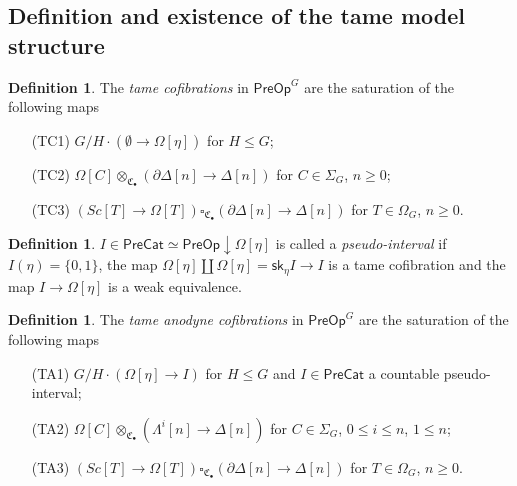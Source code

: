 \documentclass[a4paper,10pt
,draft
]{article}%
\numberwithin{equation}{section}
\numberwithin{figure}{section}
\theoremstyle{definition} %
\newtheorem{definition}[equation]{Definition}%
\newcommand{\1}{\ensuremath{\mathbbm 1}}%
\begin{document}
\subsection{Definition and existence of the tame model structure}
\label{TAMEDEFEX SEC}

\begin{definition}\label{TAMEGENCOF DEF}
	The \emph{tame cofibrations} in $\mathsf{PreOp}^G$
	are the saturation of the following maps
	\begin{itemize}
		\item[(TC1)] $G/H \cdot \left(\emptyset \to\Omega[\eta]\right)$ for $H\leq G$;
		\item[(TC2)] 
		$\Omega[C] \otimes_{\mathfrak{C}_{\bullet}} \left(\partial \Delta[n] \to \Delta[n]\right)$ for $C \in \Sigma_G$, $n \geq 0$;
		\item[(TC3)] 
		$\left( Sc[T] \to \Omega[T] \right) 
		\square_{\mathfrak{C}_{\bullet}} 
		\left(\partial \Delta[n] \to \Delta[n]\right)$ for $T \in \Omega_G$, $n \geq 0$.
	\end{itemize}
\end{definition}


\begin{definition}\label{PSEUINT DEF}
	$I \in \mathsf{PreCat}\simeq \mathsf{PreOp} \downarrow \Omega[\eta]$ 
	is called a \emph{pseudo-interval}
	if $I(\eta) = \{0,1\}$,
	the map 
	$\Omega[\eta] \amalg \Omega[\eta]
	= \mathsf{sk}_{\eta} I \to I$
	is a tame cofibration and the map
	$I \to \Omega[\eta]$
	is a weak equivalence.
\end{definition}


\begin{definition}\label{TAMEGENANO DEF}
	The \emph{tame anodyne cofibrations} in $\mathsf{PreOp}^G$ 
	are the saturation of the following maps
	\begin{itemize}
		\item[(TA1)] $G/H \cdot 
		\left(\Omega[\eta] \to I \right)$ for $H \leq G$
		and $I \in \mathsf{PreCat}$
		a countable pseudo-interval;
		\item[(TA2)] $\Omega[C] \otimes_{\mathfrak{C}_{\bullet}} \left(\Lambda^i[n] \to \Delta[n]\right)$ for $C \in \Sigma_G$, $0 \leq i \leq n$, $1 \leq n$;
		\item[(TA3)] 
		$\left( Sc[T] \to \Omega[T] \right) 
		\square_{\mathfrak{C}_{\bullet}}
		\left(\partial \Delta[n] \to \Delta[n]\right)$ for $T \in \Omega_G$, $n \geq 0$.
	\end{itemize}
\end{definition}
\end{document}
